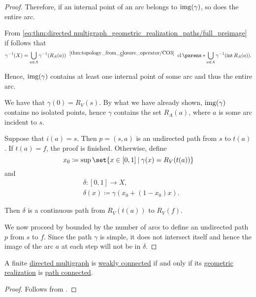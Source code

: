 \begin{proof}
  Therefore, if an internal point of an arc belongs to \( \operatorname{img}(\gamma) \), so does the entire arc.

   From \eqref{eq:thm:directed multigraph_geometric_realization_paths/full_preimage} if follows that
  \begin{equation*}
    \gamma^{-1}(X)
    =
    \bigcup_{a \in A} \gamma^{-1}(R_A(a))
    \reloset{\ref{thm:topology_from_closure_operator/CO3}} =
    \cl\parens*{ \bigcup_{a \in A} \gamma^{-1}(\Int R_A(a)) }.
  \end{equation*}

  Hence, \( \operatorname{img}(\gamma) \) contains at least one internal point of some arc and thus the entire arc.

   We have that \( \gamma(0) = R_V(s) \). By what we have already shown, \( \operatorname{img}(\gamma) \) contains no isolated points, hence \( \gamma \) contains the set \( R_A(a) \), where \( a \) is some arc incident to \( s \).

  Suppose that \( i(a) = s \). Then \( p = (s, a) \) is an undirected path from \( s \) to \( t(a) \). If \( t(a) = f \), the proof is finished. Otherwise, define
  \begin{equation*}
    x_0 \coloneqq \sup\set{ x \in [0, 1] \given \gamma(x) = R_V(t(a)) }
  \end{equation*}
  and
  \begin{equation*}
    \begin{aligned}
      &\delta: [0, 1] \to X, \\
      &\delta(x) \coloneqq \gamma(x_0 + (1 - x_0) x).
    \end{aligned}
  \end{equation*}

  Then \( \delta \) is a continuous path from \( R_V(t(a)) \) to \( R_V(f) \).

  We now proceed by  bounded by the number of arcs to define an undirected path \( p \) from \( s \) to \( f \). Since the path \( \gamma \) is simple, it does not intersect itself and hence the image of the arc \( a \) at each step will not be in \( \delta \).
\end{proof}

\begin{corollary}\label{thm:directed multigraph_geometric_realization_connectedness}
  A finite \hyperref[def:directed_multigraph]{directed multigraph} is \hyperref[def:graph_connectedness/weak]{weakly connected} if and only if its \hyperref[def:directed_multigraph_geometric_realization/undirected]{geometric realization} is \hyperref[def:path_connected_space]{path connected}.
\end{corollary}
\begin{proof}
  Follows from .
\end{proof}

